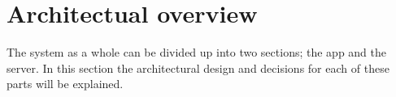 \newpage
\section{Architectual overview}
The system as a whole can be divided up into two sections; the app and the server. In this section the architectural design and decisions for each of these parts will be explained.


